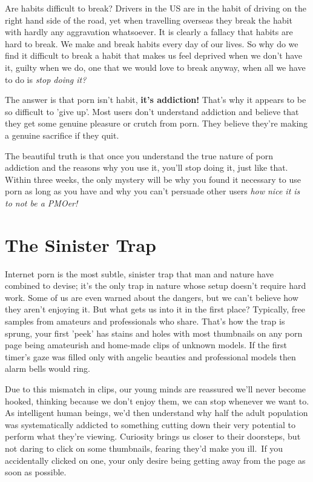 \documentclass[
]{book}
\begin{document}
Are habits difficult to break? Drivers in the US are in the habit of driving on the right hand side of the road, yet when travelling overseas they break the habit with hardly any aggravation whatsoever. It is clearly a fallacy that habits are hard to break. We make and break habits every day of our lives. So why do we find it difficult to break a habit that makes us feel deprived when we don't have it, guilty when we do, one that we would love to break anyway, when all we have to do is \emph{stop doing it?}

The answer is that porn isn't habit, \textbf{it's addiction!} That's why it appears to be so difficult to 'give up'. Most users don't understand addiction and believe that they get some genuine pleasure or crutch from porn. They believe they're making a genuine sacrifice if they quit.

The beautiful truth is that once you understand the true nature of porn addiction and the reasons why you use it, you'll stop doing it, just like that. Within three weeks, the only mystery will be why you found it necessary to use porn as long as you have and why you can't persuade other users \emph{how nice it is to not be a PMOer!}

\hypertarget{the-sinister-trap}{%
\section{The Sinister Trap}\label{the-sinister-trap}}

Internet porn is the most subtle, sinister trap that man and nature have combined to devise; it's the only trap in nature whose setup doesn't require hard work. Some of us are even warned about the dangers, but we can't believe how they aren't enjoying it. But what gets us into it in the first place? Typically, free samples from amateurs and professionals who share. That's how the trap is sprung, your first 'peek' has stains and holes with most thumbnails on any porn page being amateurish and home-made clips of unknown models. If the first timer's gaze was filled only with angelic beauties and professional models then alarm bells would ring.

Due to this mismatch in clips, our young minds are reassured we'll never become hooked, thinking because we don't enjoy them, we can stop whenever we want to. As intelligent human beings, we'd then understand why half the adult population was systematically addicted to something cutting down their very potential to perform what they're viewing. Curiosity brings us closer to their doorsteps, but not daring to click on some thumbnails, fearing they'd make you ill.~If you accidentally clicked on one, your only desire being getting away from the page as soon as possible.
\end{document}
